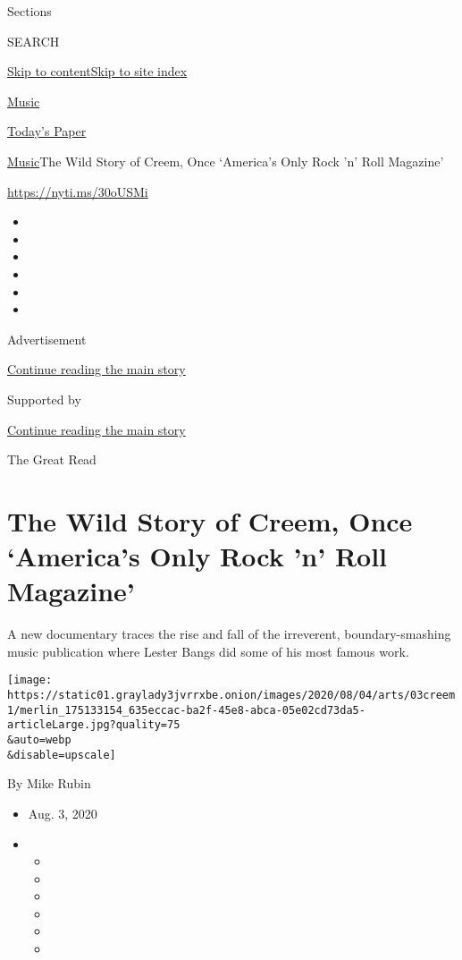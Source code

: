 Sections

SEARCH

\protect\hyperlink{site-content}{Skip to
content}\protect\hyperlink{site-index}{Skip to site index}

\href{https://www.nytimes3xbfgragh.onion/section/arts/music}{Music}

\href{https://myaccount.nytimes3xbfgragh.onion/auth/login?response_type=cookie\&client_id=vi}{}

\href{https://www.nytimes3xbfgragh.onion/section/todayspaper}{Today's
Paper}

\href{/section/arts/music}{Music}\textbar{}The Wild Story of Creem, Once
`America's Only Rock 'n' Roll Magazine'

\url{https://nyti.ms/30oUSMi}

\begin{itemize}
\item
\item
\item
\item
\item
\item
\end{itemize}

Advertisement

\protect\hyperlink{after-top}{Continue reading the main story}

Supported by

\protect\hyperlink{after-sponsor}{Continue reading the main story}

The Great Read

\hypertarget{the-wild-story-of-creem-once-americas-only-rock-n-roll-magazine}{%
\section{The Wild Story of Creem, Once `America's Only Rock 'n' Roll
Magazine'}\label{the-wild-story-of-creem-once-americas-only-rock-n-roll-magazine}}

A new documentary traces the rise and fall of the irreverent,
boundary-smashing music publication where Lester Bangs did some of his
most famous work.

\texttt{[image: https://static01.graylady3jvrrxbe.onion/images/2020/08/04/arts/03creem1/merlin\_175133154\_635eccac-ba2f-45e8-abca-05e02cd73da5-articleLarge.jpg?quality=75\\\&auto=webp\\\&disable=upscale]}

By Mike Rubin

\begin{itemize}
\item
  Aug. 3, 2020
\item
  \begin{itemize}
  \item
  \item
  \item
  \item
  \item
  \item
  \end{itemize}
\end{itemize}

